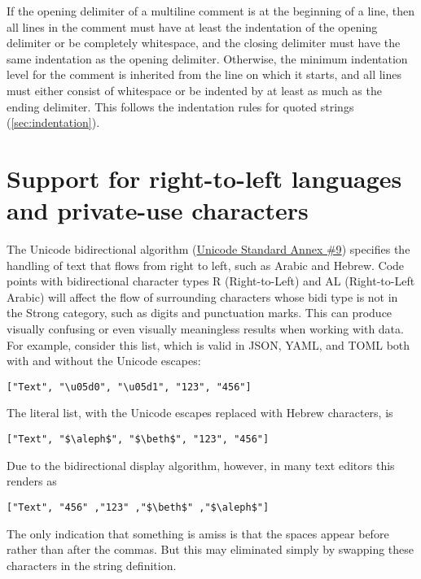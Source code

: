 \documentclass[11pt]{article}
\begin{document}
If the opening delimiter of a multiline comment is at the beginning of a line, then all lines in the comment must have at least the indentation of the opening delimiter or be completely whitespace, and the closing delimiter must have the same indentation as the opening delimiter.  Otherwise, the minimum indentation level for the comment is inherited from the line on which it starts, and all lines must either consist of whitespace or be indented by at least as much as the ending delimiter. This follows the indentation rules for quoted strings (\cref{sec:indentation}).



\section{Support for right-to-left languages and private-use characters}
\label{sec:right-to-left}

The Unicode bidirectional algorithm (\href{http://unicode.org/reports/tr9/}{Unicode Standard Annex \#9}) specifies the handling of text that flows from right to left, such as Arabic and Hebrew.  Code points with bidirectional character types R (Right-to-Left) and AL (Right-to-Left Arabic) will affect the flow of surrounding characters whose bidi type is not in the Strong category, such as digits and punctuation marks.  This can produce visually confusing or even visually meaningless results when working with data.  For example, consider this list, which is valid in JSON, YAML, and TOML both with and without the Unicode escapes:
\begin{Verbatim}
["Text", "\u05d0", "\u05d1", "123", "456"]
\end{Verbatim}
The literal list, with the Unicode escapes replaced with Hebrew characters, is
\begin{Verbatim}[commandchars=\\\{\}, mathescape]
["Text", "$\aleph$", "$\beth$", "123", "456"]
\end{Verbatim}
Due to the bidirectional display algorithm, however, in many text editors this renders as
\begin{Verbatim}[commandchars=\\\{\}, mathescape]
["Text", "456" ,"123" ,"$\beth$" ,"$\aleph$"]
\end{Verbatim}
The only indication that something is amiss is that the spaces appear before rather than after the commas.  But this may eliminated simply by swapping these characters in the string definition.
\end{document}
